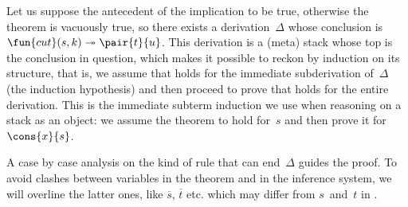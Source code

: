 Let us suppose the antecedent of the implication to be true, otherwise
the theorem is vacuously true, so there exists a derivation~\(\Delta\)
whose conclusion is \(\fun{cut}(s,k) \twoheadrightarrow
\pair{t}{u}\). This derivation is a (meta) stack whose top is the
conclusion in question, which makes it possible to reckon by induction
on its structure, that is, we assume that  holds for
the immediate sub\-derivation of~\(\Delta\) (the induction hypothesis)
and then proceed to prove that  holds for the entire
derivation. This is the immediate subterm induction we use when
reasoning on a stack as an object: we assume the theorem to hold
for~\(s\) and then prove it for~\(\cons{x}{s}\).

A case by case analysis on the kind of rule that can end~\(\Delta\)
guides the proof. To avoid clashes between variables in the theorem
and in the inference system, we will overline the latter ones, like
\(\overline{s}\), \(\overline{t}\) etc. which may differ from
\(s\)~and~\(t\) in .
